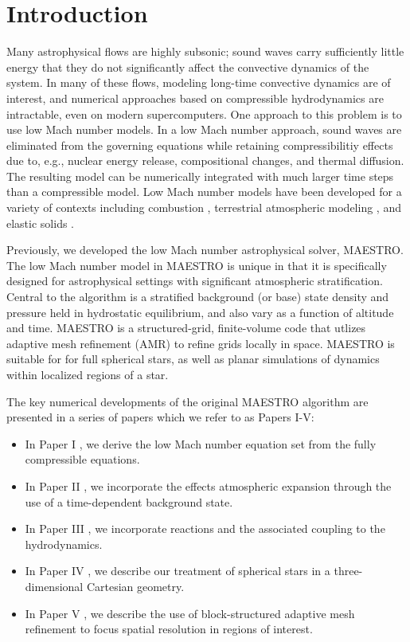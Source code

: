 \section{Introduction} \label{sec:intro}
Many astrophysical flows are highly subsonic; sound waves carry sufficiently little energy that they do not significantly affect the convective dynamics of the system.
In many of these flows, modeling long-time convective dynamics are of interest, and numerical approaches based on compressible hydrodynamics are intractable, even on modern supercomputers.
One approach to this problem is to use low Mach number models.
In a low Mach number approach, sound waves are eliminated from the governing equations while retaining compressibilitiy effects due to, e.g., nuclear energy release, compositional changes, and thermal diffusion.
The resulting model can be numerically integrated with much larger time steps than a compressible model.
Low Mach number models have been developed for a variety of contexts including combustion \citep{day2000numerical}, terrestrial atmospheric modeling \citep{duarte2015low}, 
and elastic solids \citep{abbate2017all}.

Previously, we developed the low Mach number astrophysical solver, MAESTRO.
The low Mach number model in MAESTRO is unique in that it is specifically designed for astrophysical settings with significant atmospheric stratification.
Central to the algorithm is a stratified background (or base) state density and pressure held in hydrostatic equilibrium, and also vary as a function of altitude and time.
MAESTRO is a structured-grid, finite-volume code that utlizes adaptive mesh refinement (AMR) to refine grids locally in space.
MAESTRO is suitable for for full spherical stars, as well as planar simulations of dynamics within localized regions of a star.

The key numerical developments of the original MAESTRO algorithm are presented in a series of papers which we refer to as Papers I-V:
\begin{itemize}
\item In Paper I \citep{MAESTRO_I}, we derive the low Mach number equation set from the fully compressible equations.
\item In Paper II \citep{MAESTRO_II}, we incorporate the effects atmospheric expansion through the use of a time-dependent background state.
\item In Paper III \citep{MAESTRO_III}, we incorporate reactions and the associated coupling to the hydrodynamics.
\item In Paper IV \citep{MAESTRO_IV}, we describe our treatment of spherical stars in a three-dimensional Cartesian geometry.
\item In Paper V \citep{MAESTRO_V}, we describe the use of block-structured adaptive mesh refinement to focus spatial resolution in regions of interest.
\end{itemize} 

